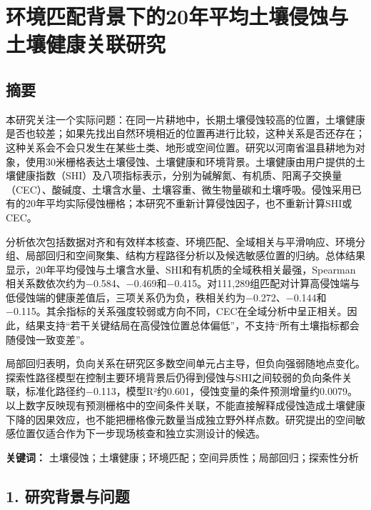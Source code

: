 \documentclass[
  10.5pt,
]{article}
\author{}
\date{}
\begin{document}
\hypertarget{ux73afux5883ux5339ux914dux80ccux666fux4e0bux768420ux5e74ux5e73ux5747ux571fux58e4ux4fb5ux8680ux4e0eux571fux58e4ux5065ux5eb7ux5173ux8054ux7814ux7a76}{%
\section{环境匹配背景下的20年平均土壤侵蚀与土壤健康关联研究}\label{ux73afux5883ux5339ux914dux80ccux666fux4e0bux768420ux5e74ux5e73ux5747ux571fux58e4ux4fb5ux8680ux4e0eux571fux58e4ux5065ux5eb7ux5173ux8054ux7814ux7a76}}

\hypertarget{ux6458ux8981}{%
\subsection{摘要}\label{ux6458ux8981}}

本研究关注一个实际问题：在同一片耕地中，长期土壤侵蚀较高的位置，土壤健康是否也较差；如果先找出自然环境相近的位置再进行比较，这种关系是否还存在；这种关系会不会只发生在某些土类、地形或空间位置。研究以河南省温县耕地为对象，使用30米栅格表达土壤侵蚀、土壤健康和环境背景。土壤健康由用户提供的土壤健康指数（SHI）及八项指标表示，分别为碱解氮、有机质、阳离子交换量（CEC）、酸碱度、土壤含水量、土壤容重、微生物量碳和土壤呼吸。侵蚀采用已有的20年平均实际侵蚀栅格；本研究不重新计算侵蚀因子，也不重新计算SHI或CEC。

分析依次包括数据对齐和有效样本核查、环境匹配、全域相关与平滑响应、环境分组、局部回归和空间聚集、结构方程路径分析以及候选敏感位置的归纳。总体结果显示，20年平均侵蚀与土壤含水量、SHI和有机质的全域秩相关最强，Spearman相关系数依次约为−0.584、−0.469和−0.415。对111,289组匹配对计算高侵蚀端与低侵蚀端的健康差值后，三项关系仍为负，秩相关约为−0.272、−0.144和−0.115。其余指标的关系强度较弱或方向不同，CEC在全域分析中呈正相关。因此，结果支持``若干关键结局在高侵蚀位置总体偏低''，不支持``所有土壤指标都会随侵蚀一致变差''。

局部回归表明，负向关系在研究区多数空间单元占主导，但负向强弱随地点变化。探索性路径模型在控制主要环境背景后仍得到侵蚀与SHI之间较弱的负向条件关联，标准化路径约−0.113，模型R²约0.601，侵蚀变量的条件预测增量约0.0079。以上数字反映现有预测栅格中的空间条件关联，不能直接解释成侵蚀造成土壤健康下降的因果效应，也不能把栅格像元数量当成独立野外样点数。研究提出的空间敏感位置仅适合作为下一步现场核查和独立实测设计的候选。

\textbf{关键词：}
土壤侵蚀；土壤健康；环境匹配；空间异质性；局部回归；探索性分析

\hypertarget{ux7814ux7a76ux80ccux666fux4e0eux95eeux9898}{%
\subsection{1.
研究背景与问题}\label{ux7814ux7a76ux80ccux666fux4e0eux95eeux9898}}
\end{document}
